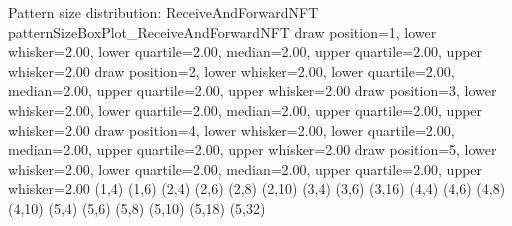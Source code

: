 \sizeBoxPlot
{Pattern size distribution: ReceiveAndForwardNFT}
{patternSizeBoxPlot_ReceiveAndForwardNFT}
{draw position=1, lower whisker=2.00, lower quartile=2.00, median=2.00, upper quartile=2.00, upper whisker=2.00}
{draw position=2, lower whisker=2.00, lower quartile=2.00, median=2.00, upper quartile=2.00, upper whisker=2.00}
{draw position=3, lower whisker=2.00, lower quartile=2.00, median=2.00, upper quartile=2.00, upper whisker=2.00}
{draw position=4, lower whisker=2.00, lower quartile=2.00, median=2.00, upper quartile=2.00, upper whisker=2.00}
{draw position=5, lower whisker=2.00, lower quartile=2.00, median=2.00, upper quartile=2.00, upper whisker=2.00}
{(1,4) (1,6) (2,4) (2,6) (2,8) (2,10) (3,4) (3,6) (3,16) (4,4) (4,6) (4,8) (4,10) (5,4) (5,6) (5,8) (5,10) (5,18) (5,32) }
